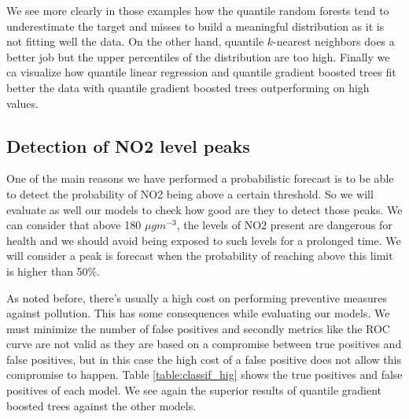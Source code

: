 \documentclass[a4paper,twocolumn,5p]{elsarticle}
\begin{document}
We see more clearly in those examples how the quantile random forests 
tend to
underestimate the target and misses to build a meaningful distribution
as it is not fitting well the data. On the other hand, 
quantile $k$-nearest
neighbors does a better job but the upper percentiles of the
distribution are too high.  Finally we ca visualize how quantile linear 
regression and quantile gradient boosted trees fit better the 
data with quantile gradient boosted trees outperforming
 on high values.


\subsection{Detection of NO2 level peaks}

One of the main reasons we have performed a probabilistic forecast 
is to be able to detect the probability of NO2 being above a certain 
threshold. So we will evaluate as well our models to check how 
good are they to detect those peaks. 
We can consider that above 180 $\mu gm^{-3}$, 
the levels of NO2 present 
are dangerous for health and we should avoid being exposed to 
such levels for a prolonged time. 
We will consider a \no peak is forecast when the 
probability of reaching above this limit is higher 
than 50\%.

As noted before, there's usually a high cost on performing preventive
measures against pollution. This has some consequences while 
evaluating our models. We must minimize the number of false 
positives and secondly metrics like the ROC curve are not valid as 
they are based on a compromise between true positives 
and false positives,
but in this case the high cost of a false positive does not allow 
this compromise to happen. Table \ref{table:classif_hig} shows 
the true positives and false positives of each model. We see again the 
superior results of quantile gradient boosted trees against the other 
models.
\end{document}
